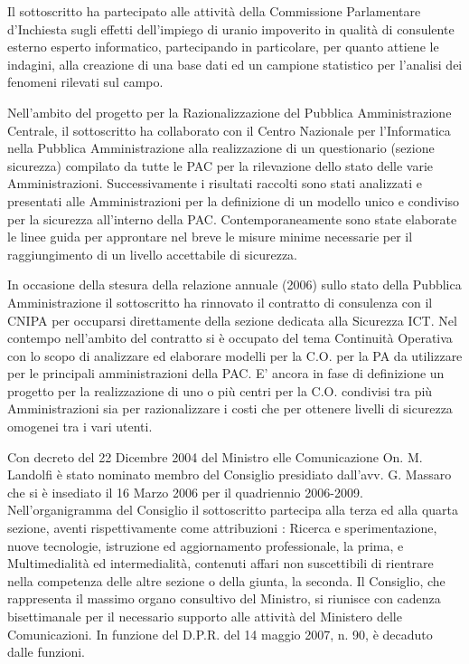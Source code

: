 \documentclass[11pt,a4paper,sans]{moderncv}        %
\begin{document}
{
Il sottoscritto ha partecipato alle attività della Commissione Parlamentare d’Inchiesta sugli effetti dell’impiego di uranio impoverito in qualità di consulente  esterno esperto informatico, partecipando in particolare, per quanto attiene le indagini, alla creazione di una base dati ed un campione statistico per l’analisi dei fenomeni rilevati sul campo.
}

{
Nell’ambito del progetto per la Razionalizzazione del Pubblica Amministrazione Centrale, il sottoscritto ha collaborato con il Centro Nazionale per l’Informatica nella Pubblica Amministrazione alla realizzazione di un questionario (sezione sicurezza) compilato da tutte le PAC per la rilevazione dello stato delle varie Amministrazioni. Successivamente i risultati raccolti sono stati analizzati e presentati alle Amministrazioni per la definizione di un modello unico e condiviso per la sicurezza all’interno della PAC. Contemporaneamente sono state elaborate le linee guida per approntare nel breve le misure minime necessarie per il raggiungimento di un livello accettabile di sicurezza.
}

{
In occasione della stesura della relazione annuale (2006) sullo stato della Pubblica Amministrazione il sottoscritto ha rinnovato il contratto  di consulenza con il CNIPA per occuparsi direttamente della sezione dedicata alla Sicurezza ICT.
Nel contempo nell’ambito del contratto si è occupato del tema Continuità Operativa con lo scopo di analizzare ed elaborare modelli per la C.O. per la PA da utilizzare per le principali amministrazioni della PAC. E’ ancora in fase di definizione un progetto per la realizzazione di uno o più centri per la C.O. condivisi tra più Amministrazioni sia per razionalizzare i costi che per ottenere livelli di sicurezza omogenei tra i vari utenti.
}

{
Con decreto del 22 Dicembre 2004 del Ministro elle Comunicazione On. M. Landolfi è stato nominato membro del Consiglio presidiato dall’avv. G. Massaro che si è insediato il 16 Marzo 2006 per il quadriennio 2006-2009. Nell’organigramma del Consiglio il sottoscritto partecipa alla terza ed alla quarta sezione, aventi rispettivamente come attribuzioni :
Ricerca e sperimentazione, nuove tecnologie, istruzione ed aggiornamento professionale, la prima, e Multimedialità ed intermedialità, contenuti affari non suscettibili di rientrare nella competenza delle altre sezione o della giunta, la seconda. Il Consiglio, che rappresenta il massimo organo consultivo del Ministro, si riunisce con cadenza bisettimanale per il necessario supporto alle attività del Ministero delle Comunicazioni. In funzione del D.P.R. del 14 maggio 2007, n. 90, è decaduto dalle funzioni.
}
\end{document}

